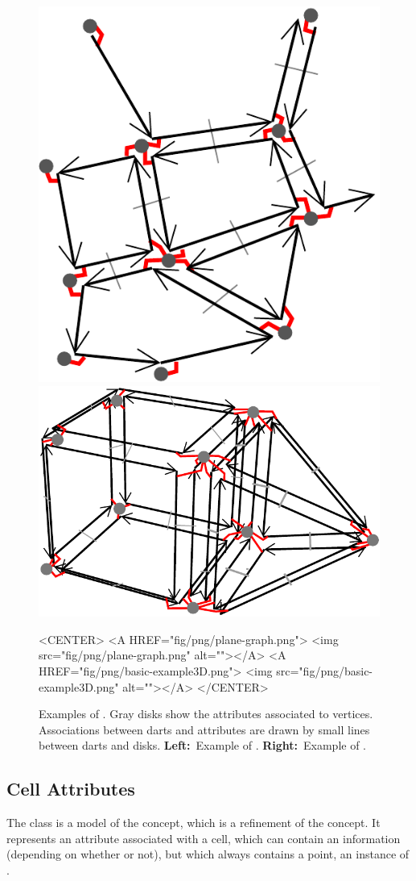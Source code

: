 \begin{figure}
\begin{ccTexOnly}
  \centerline{\includegraphics[width=.25\textwidth]
    {Linear_cell_complex/fig/pdf/plane-graph}
  \qquad
  \includegraphics[width=.45\textwidth]
  {Linear_cell_complex/fig/pdf/basic-example3D}}
\end{ccTexOnly}
\begin{ccHtmlOnly}
  <CENTER>
  <A HREF="fig/png/plane-graph.png">
      <img src="fig/png/plane-graph.png" alt=""></A>
  <A HREF="fig/png/basic-example3D.png">
      <img src="fig/png/basic-example3D.png" alt=""></A>
  </CENTER>
\end{ccHtmlOnly}
\caption{Examples of . Gray disks show the
  attributes associated to vertices. Associations between darts and
  attributes are drawn by small lines between darts and disks.
  \textbf{Left:}~Example of .
  \textbf{Right:}~Example of .}
\label{fig-combi_map_with_point}
\end{figure}

\subsection{Cell Attributes}\label{ssec-attribute-wp}

The
class is a model of the  concept, which is
a refinement of the  concept. It represents an
attribute associated with a cell, which can contain an information
(depending on whether  or not), but which always
contains a point, an instance of .

